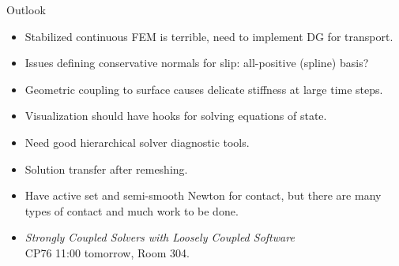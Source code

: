 \documentclass{beamer}
\begin{document}
\begin{frame}{Outlook}
  \begin{itemize}
  \item Stabilized continuous FEM is terrible, need to implement DG for transport.
  \item Issues defining conservative normals for slip: all-positive (\eg spline) basis?
  \item Geometric coupling to surface causes delicate stiffness at large time steps.
  \item Visualization should have hooks for solving equations of state.
  \item Need good hierarchical solver diagnostic tools.
  \item Solution transfer after remeshing.
  \item Have active set and semi-smooth Newton for contact, but there are many types of contact and much work to be done.
  \item \emph{Strongly Coupled Solvers with Loosely Coupled Software} \\
    CP76 11:00 tomorrow, Room 304.
  \end{itemize}
\end{frame}
\end{document}
